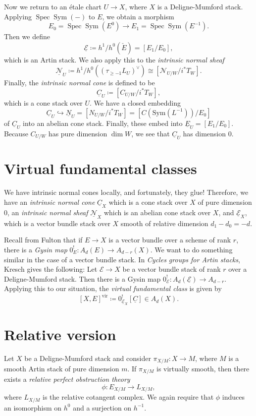 \documentclass[leqno, openany]{memoir}
\theoremstyle{definition}
\theoremstyle{remark}
\theoremstyle{plain}
\theoremstyle{definition}
\theoremstyle{remark}
\newcommand{\mc}[1]{\mathcal{#1}}
\newcommand{\mr}[1]{\mathrm{#1}}
\newcommand{\on}[1]{\operatorname{#1}}
\newcommand{\ul}[1]{\underline{#1}}
\DeclareMathOperator{\Spec}{Spec}
\begin{document}
Now we return to an \'etale chart $U \to X$, where $X$ is a Deligne-Mumford stack. Applying $\Spec \on{Sym}(-)$ to $E$, we obtain a morphism
\[ E_0 = \Spec \on{Sym}(E^0) \to E_1 = \Spec \on{Sym}(E^{-1}). \]
Then we define 
\[ \underline{\mc{E}} \coloneqq h^1 / h^0 (\check{E}) = [E_1 / E_0], \] 
which is an Artin stack. We also apply this to the \textit{intrinsic normal sheaf}
\[ \underline{\mc{N}}_U \coloneqq h^1 / h^0(( \tau_{\geq -1} L_U )^{\vee}) \cong [\mc{N}_{U/W} / i^* T_W]. \]
Finally, the \textit{intrinsic normal cone} is defined to be
\[ \ul{C}_U \coloneqq [C_{U/W} / i^* T_W], \]
which is a cone stack over $U$. We have a closed embedding 
\[ \ul{C}_U \hookrightarrow \ul{N}_U = [N_{U/W} / i^* T_W] = [C(\mr{Sym}(L^{-1})) / E_0] \]
of $\ul{C}_U$ into an abelian cone stack. Finally, these embed into $\ul{E}_U = [E_1 / E_0]$. Because $C_{U/W}$ has pure dimension $\dim W$, we see that $\ul{C}_U$ has dimension $0$.

\section{Virtual fundamental classes}
We have intrinsic normal cones locally, and fortunately, they glue! Therefore, we have an \textit{intrinsic normal cone} $\ul{C}_X$ which is a cone stack over $X$ of pure dimension $0$, an \textit{intrinsic normal sheaf} $\ul{\mc{N}}_X$ which is an abelian cone stack over $X$, and $\ul{\mc{E}}_X$, which is a vector bundle stack over $X$ smooth of relative dimension $d_1 - d_0 = -d$.

Recall from Fulton that if $E \to X$ is a vector bundle over a scheme of rank $r$, there is a \textit{Gysin map} $0_E^! \colon A_d(E) \to A_{d-r}(X)$. We want to do something similar in the case of a vector bundle stack. In \textit{Cycles groups for Artin stacks}, Kresch gives the following: Let $\mc{E} \to X$ be a vector bundle stack of rank $r$ over a Deligne-Mumford stack. Then there is a Gysin map $0_{\mc{E}}^! \colon A_d(\ul{\mc{E}}) \to A_{d-r}$. Applying this to our situation, the \textit{virtual fundamental class} is given by
\[ [X, E]^{\mr{vir}} \coloneqq 0_{\ul{\mc{E}}_X}^! [\ul{C}] \in A_d(X). \]

\section{Relative version}
Let $X$ be a Deligne-Mumford stack and consider $\pi_{X/M} \colon X \to M$, where $M$ is a smooth Artin stack of pure dimension $m$. If $\pi_{X/M}$ is virtually smooth, then there exists a \textit{relative perfect obstruction theory}
\[ \phi \colon E_{X/M} \to L_{X/M}, \]
where $L_{X/M}$ is the relative cotangent complex. We again require that $\phi$ induces an isomorphism on $h^0$ and a surjection on $h^{-1}$.
\end{document}
